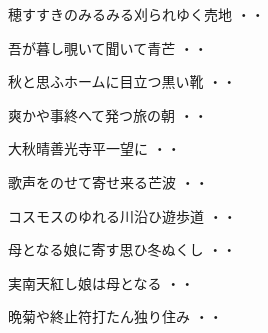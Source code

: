 \vspace{0.6cm}
\begin{shiika}穂すすきのみるみる刈られゆく売地
\hfill{・・}\end{shiika}
\vspace{0.6cm}
\begin{shiika}吾が暮し覗いて聞いて青芒
\hfill{・・}\end{shiika}
\vspace{0.6cm}
\begin{shiika}秋と思ふホームに目立つ黒い靴
\hfill{・・}\end{shiika}
\vspace{0.6cm}
\begin{shiika}爽かや事終へて発つ旅の朝
\hfill{・・}\end{shiika}
\vspace{0.6cm}
\begin{shiika}大秋晴善光寺平一望に
\hfill{・・}\end{shiika}
\vspace{0.6cm}
\begin{shiika}歌声をのせて寄せ来る芒波
\hfill{・・}\end{shiika}
\vspace{0.6cm}
\begin{shiika}コスモスのゆれる川沿ひ遊歩道
\hfill{・・}\end{shiika}
\vspace{0.6cm}
\begin{shiika}母となる娘に寄す思ひ冬ぬくし
\hfill{・・}\end{shiika}
\vspace{0.6cm}
\begin{shiika}実南天紅し娘は母となる
\hfill{・・}\end{shiika}
\vspace{0.6cm}
\begin{shiika}晩菊や終止符打たん独り住み
\hfill{・・}\end{shiika}
\vspace{0.6cm}
